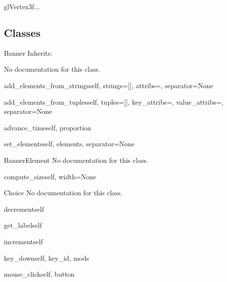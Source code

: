 \begin{funcdesc}{glVertex3f}{...}
\end{funcdesc}

\subsection{Classes}
\begin{classdesc*}{Banner}
Inherits:

No documentation for this class.

\begin{methoddesc}{add_elements_from_strings}{self, strings=[], attribs={}, separator=None}
\end{methoddesc}

\begin{methoddesc}{add_elements_from_tuples}{self, tuples=[], key_attribs={}, value_attribs={}, separator=None}
\end{methoddesc}

\begin{methoddesc}{advance_time}{self, proportion}
\end{methoddesc}

\begin{methoddesc}{set_elements}{self, elements, separator=None}
\end{methoddesc}

\end{classdesc*}

\begin{classdesc*}{BannerElement}
No documentation for this class.

\begin{methoddesc}{compute_size}{self, width=None}
\end{methoddesc}

\end{classdesc*}

\begin{classdesc*}{Choice}
No documentation for this class.

\begin{methoddesc}{decrement}{self}
\end{methoddesc}

\begin{methoddesc}{get_label}{self}
\end{methoddesc}

\begin{methoddesc}{increment}{self}
\end{methoddesc}

\begin{methoddesc}{key_down}{self, key_id, mods}
\end{methoddesc}

\begin{methoddesc}{mouse_click}{self, button}
\end{methoddesc}

\end{classdesc*}

